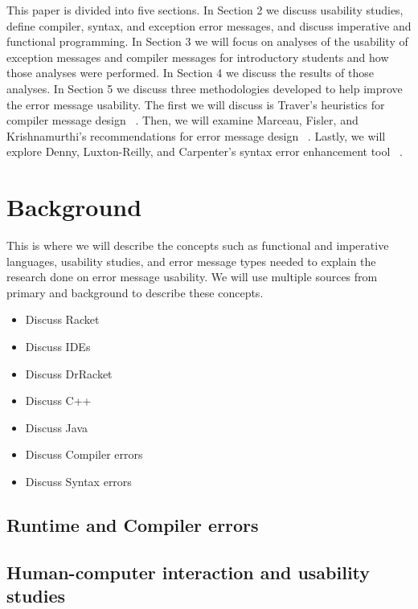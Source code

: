 \documentclass{sig-alternate}
\begin{document}
This paper is divided into five sections. In Section 2 we discuss usability studies, define compiler, syntax, and exception error messages, and discuss imperative and functional programming. In Section 3 we will focus on  analyses of the usability of exception messages and compiler messages for introductory students and how those analyses were performed. In Section 4 we discuss the results of those analyses. In Section 5 we discuss three methodologies developed to help improve the error message usability. The first we will discuss is Traver's heuristics for compiler message design ~\cite{Traver:2010}. Then, we will examine Marceau, Fisler, and Krishnamurthi's recommendations for error message design ~\cite{Marceau:2011:MYL:2048237.2048241}. Lastly, we will explore Denny, Luxton-Reilly, and Carpenter's syntax error enhancement tool ~\cite{Denny:2014:ESE:2591708.2591748}.



\section{Background}\label{background}
This is where we will describe the concepts such as functional and imperative languages, usability studies, and error message types needed to explain the research done on error message usability. We will use multiple sources from primary and background to describe these concepts. 

\begin{itemize}
	\item Discuss Racket
	\item Discuss IDEs
	\item Discuss DrRacket
	\item Discuss C++
	\item Discuss Java
	\item Discuss Compiler errors
	\item Discuss Syntax errors
\end{itemize}


\subsection{Runtime and Compiler errors}

\subsection{Human-computer interaction and usability studies}
\end{document}
